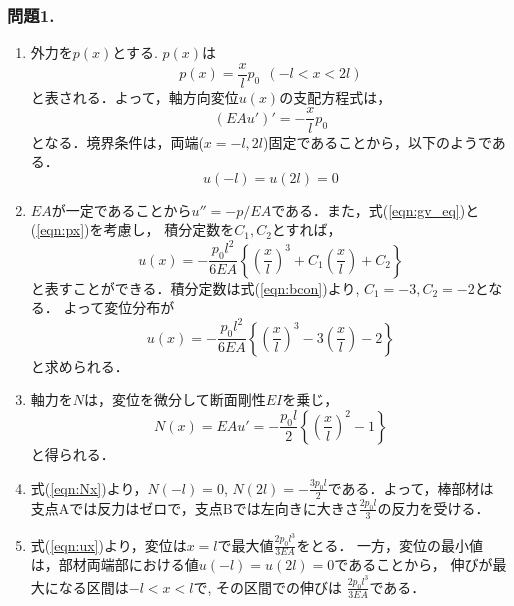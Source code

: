 \documentclass[10pt,a4j]{jarticle}
\begin{document}
\subsubsection*{問題1.}
\begin{enumerate}
\item
	外力を$p(x)$とする. $p(x)$は
	\begin{equation}
		p(x)=\frac{x}{l}p_0 
		\ \ \left(-l < x < 2l \right)
		\label{eqn:px}
	\end{equation}
	と表される．よって，軸方向変位$u(x)$の支配方程式は，
	\begin{equation}
		\left( EAu' \right)'=-\frac{x}{l}p_0
		\label{eqn:gv_eq}
	\end{equation}
	となる．境界条件は，両端($x=-l,2l$)固定であることから，以下のようである．
	\begin{equation}
		u(-l)=u(2l)=0
		\label{eqn:bcon}
	\end{equation}
\item
	$EA$が一定であることから$u''=-p/EA$である．また，式(\ref{eqn:gv_eq})と(\ref{eqn:px})を考慮し，
	積分定数を$C_1, C_2$とすれば，
	\begin{equation}
		u(x)=-\frac{p_0l^2}{6EA}\left\{
			\left( \frac{x}{l}\right)^3
			+
			C_1\left( \frac{x}{l}\right)
			+
			C_2
		\right\}
	\end{equation}
	と表すことができる．積分定数は式(\ref{eqn:bcon})より, $C_1=-3, C_2=-2$となる．
	よって変位分布が
	\begin{equation}
		u(x)=-\frac{p_0l^2}{6EA}\left\{
			\left( \frac{x}{l}\right)^3
			-
			3
			\left( \frac{x}{l}\right)
			-2
		\right\}
		\label{eqn:ux}
	\end{equation}
	と求められる．
\item
	軸力を$N$は，変位を微分して断面剛性$EI$を乗じ，
	\begin{equation}
		N(x)=EAu'=-\frac{p_0l}{2}
			\left\{
			\left(\frac{x}{l}\right)^2 -1
			\right\}
		\label{eqn:Nx}
	\end{equation}
	と得られる．
\item
	式(\ref{eqn:Nx})より，$N(-l)=0$,
	$N(2l)=-\frac{3p_0l}{2}$である．よって，棒部材は
	支点Aでは反力はゼロで，支点Bでは左向きに大きさ$\frac{2p_0l}{3}$の反力を受ける．
\item
	式(\ref{eqn:ux})より，変位は$x=l$で最大値$\frac{2p_0l^3}{3EA}$をとる．
	一方，変位の最小値は，部材両端部における値$u(-l)=u(2l)=0$であることから，
	伸びが最大になる区間は$-l<x<l $で, その区間での伸びは
	$\frac{2p_0l^3}{3EA}$である．
\end{enumerate}
\newpage
\end{document}
